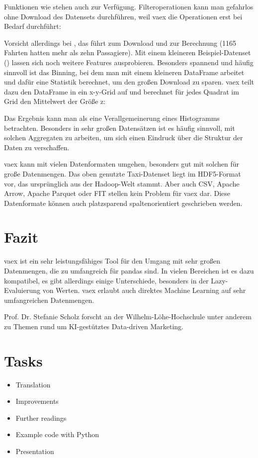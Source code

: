 Funktionen wie  stehen auch zur Verfügung. Filteroperationen kann man gefahrlos ohne Download des Datensets durchführen, weil vaex die Operationen erst bei Bedarf durchführt:

\medskip


\medskip

Vorsicht allerdings bei , das führt zum Download und zur Berechnung (1165 Fahrten hatten mehr als zehn Passagiere). Mit einem kleineren Beispiel-Datenset () lassen sich noch weitere Features ausprobieren. Besonders spannend und häufig sinnvoll ist das Binning, bei dem man mit einem kleineren DataFrame arbeitet und dafür eine Statistik berechnet, um den großen Download zu sparen. vaex teilt dazu den DataFrame in ein x-y-Grid auf und berechnet für jedes Quadrat im Grid den Mittelwert der Größe z:

\medskip



\medskip

Das Ergebnis kann man als eine Verallgemeinerung eines Histogramms betrachten. Besonders in sehr großen Datensätzen ist es häufig sinnvoll, mit solchen Aggregaten zu arbeiten, um sich einen Eindruck über die Struktur der Daten zu verschaffen.

vaex kann mit vielen Datenformaten umgehen, besonders gut mit solchen für große Datenmengen. Das oben genutzte Taxi-Datenset liegt im HDF5-Format vor, das ursprünglich aus der Hadoop-Welt stammt. Aber auch CSV, Apache Arrow, Apache Parquet oder FIT stellen kein Problem für vaex dar. Diese Datenformate können auch platzsparend spaltenorientiert geschrieben werden.


\section{Fazit}

vaex ist ein sehr leistungsfähiges Tool für den Umgang mit sehr großen Datenmengen, die zu umfangreich für pandas sind. In vielen Bereichen ist es dazu kompatibel, es gibt allerdings einige Unterschiede, besonders in der Lazy-Evaluierung von Werten. vaex erlaubt auch direktes Machine Learning auf sehr umfangreichen Datenmengen.

Prof. Dr. Stefanie Scholz forscht an der Wilhelm-Löhe-Hochschule unter anderem zu Themen rund um KI-gestütztes Data-driven Marketing.

\section{Tasks}


\begin{itemize}
	\item Translation
	\item Improvements
	\item Further readings
	\item Example code with Python
	\item Presentation 
\end{itemize}

